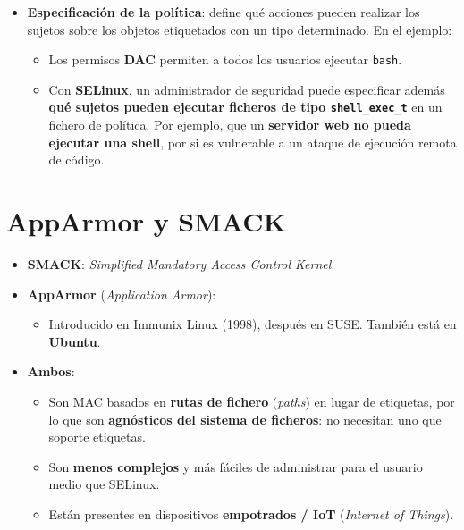 \documentclass[11pt,a4paper]{report}
\begin{document}
\begin{itemize}
  \item \textbf{Especificación de la política}: define qué acciones pueden realizar los sujetos sobre los objetos etiquetados con un tipo determinado. En el ejemplo:
    \begin{itemize}
      \item Los permisos \textbf{DAC} permiten a todos los usuarios ejecutar \texttt{bash}.
      \item Con \textbf{SELinux}, un administrador de seguridad puede especificar además \textbf{qué sujetos pueden ejecutar ficheros de tipo \texttt{shell\_exec\_t}} en un fichero de política. Por ejemplo, que un \textbf{servidor web no pueda ejecutar una shell}, por si es vulnerable a un ataque de ejecución remota de código.
    \end{itemize}
\end{itemize}
 
\section{AppArmor y SMACK}
 
\begin{itemize}
  \item \textbf{SMACK}: \emph{Simplified Mandatory Access Control Kernel}.
  \item \textbf{AppArmor} (\emph{Application Armor}):
    \begin{itemize}
      \item Introducido en Immunix Linux (1998), después en SUSE. También está en \textbf{Ubuntu}.
    \end{itemize}
  \item \textbf{Ambos}:
    \begin{itemize}
      \item Son MAC basados en \textbf{rutas de fichero} (\emph{paths}) en lugar de etiquetas, por lo que son \textbf{agnósticos del sistema de ficheros}: no necesitan uno que soporte etiquetas.
      \item Son \textbf{menos complejos} y más fáciles de administrar para el usuario medio que SELinux.
      \item Están presentes en dispositivos \textbf{empotrados / IoT} (\emph{Internet of Things}).
    \end{itemize}
\end{itemize}
 
\end{document}
